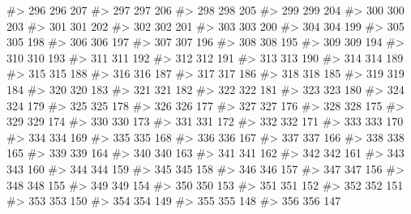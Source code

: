 \documentclass[
  letterpaper,
  DIV=11,
  numbers=noendperiod]{scrreprt}
\newenvironment{Shaded}{\begin{snugshade}}{\end{snugshade}}
\newcommand{\CommentTok}[1]{\textcolor[rgb]{0.37,0.37,0.37}{#1}}
\begin{document}
\begin{Shaded}
\begin{Highlighting}[]
\CommentTok{\#\textgreater{} 296 296  207}
\CommentTok{\#\textgreater{} 297 297  206}
\CommentTok{\#\textgreater{} 298 298  205}
\CommentTok{\#\textgreater{} 299 299  204}
\CommentTok{\#\textgreater{} 300 300  203}
\CommentTok{\#\textgreater{} 301 301  202}
\CommentTok{\#\textgreater{} 302 302  201}
\CommentTok{\#\textgreater{} 303 303  200}
\CommentTok{\#\textgreater{} 304 304  199}
\CommentTok{\#\textgreater{} 305 305  198}
\CommentTok{\#\textgreater{} 306 306  197}
\CommentTok{\#\textgreater{} 307 307  196}
\CommentTok{\#\textgreater{} 308 308  195}
\CommentTok{\#\textgreater{} 309 309  194}
\CommentTok{\#\textgreater{} 310 310  193}
\CommentTok{\#\textgreater{} 311 311  192}
\CommentTok{\#\textgreater{} 312 312  191}
\CommentTok{\#\textgreater{} 313 313  190}
\CommentTok{\#\textgreater{} 314 314  189}
\CommentTok{\#\textgreater{} 315 315  188}
\CommentTok{\#\textgreater{} 316 316  187}
\CommentTok{\#\textgreater{} 317 317  186}
\CommentTok{\#\textgreater{} 318 318  185}
\CommentTok{\#\textgreater{} 319 319  184}
\CommentTok{\#\textgreater{} 320 320  183}
\CommentTok{\#\textgreater{} 321 321  182}
\CommentTok{\#\textgreater{} 322 322  181}
\CommentTok{\#\textgreater{} 323 323  180}
\CommentTok{\#\textgreater{} 324 324  179}
\CommentTok{\#\textgreater{} 325 325  178}
\CommentTok{\#\textgreater{} 326 326  177}
\CommentTok{\#\textgreater{} 327 327  176}
\CommentTok{\#\textgreater{} 328 328  175}
\CommentTok{\#\textgreater{} 329 329  174}
\CommentTok{\#\textgreater{} 330 330  173}
\CommentTok{\#\textgreater{} 331 331  172}
\CommentTok{\#\textgreater{} 332 332  171}
\CommentTok{\#\textgreater{} 333 333  170}
\CommentTok{\#\textgreater{} 334 334  169}
\CommentTok{\#\textgreater{} 335 335  168}
\CommentTok{\#\textgreater{} 336 336  167}
\CommentTok{\#\textgreater{} 337 337  166}
\CommentTok{\#\textgreater{} 338 338  165}
\CommentTok{\#\textgreater{} 339 339  164}
\CommentTok{\#\textgreater{} 340 340  163}
\CommentTok{\#\textgreater{} 341 341  162}
\CommentTok{\#\textgreater{} 342 342  161}
\CommentTok{\#\textgreater{} 343 343  160}
\CommentTok{\#\textgreater{} 344 344  159}
\CommentTok{\#\textgreater{} 345 345  158}
\CommentTok{\#\textgreater{} 346 346  157}
\CommentTok{\#\textgreater{} 347 347  156}
\CommentTok{\#\textgreater{} 348 348  155}
\CommentTok{\#\textgreater{} 349 349  154}
\CommentTok{\#\textgreater{} 350 350  153}
\CommentTok{\#\textgreater{} 351 351  152}
\CommentTok{\#\textgreater{} 352 352  151}
\CommentTok{\#\textgreater{} 353 353  150}
\CommentTok{\#\textgreater{} 354 354  149}
\CommentTok{\#\textgreater{} 355 355  148}
\CommentTok{\#\textgreater{} 356 356  147}

\end{Highlighting}
\end{Shaded}
\end{document}
